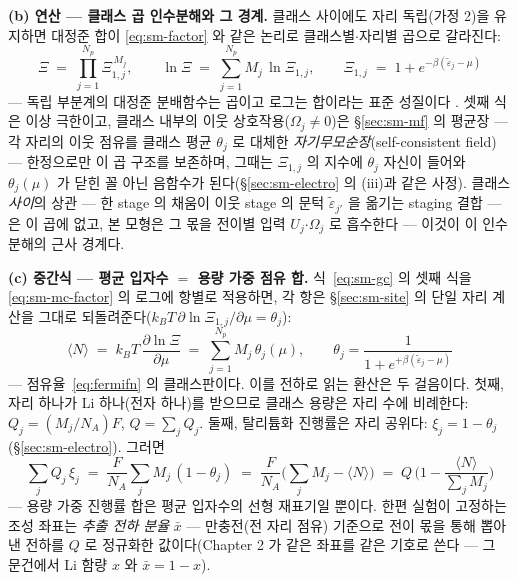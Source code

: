 \textbf{(b) 연산 --- 클래스 곱 인수분해와 그 경계.} 클래스 사이에도 자리 독립(가정 2)을 유지하면
대정준 합이 \eqref{eq:sm-factor} 와 같은 논리로 클래스별$\cdot$자리별 곱으로 갈라진다:
\begin{equation}
\Xi\;=\;\prod_{j=1}^{N_p}\Xi_{1,j}^{\,M_j},\qquad
\ln\Xi\;=\;\sum_{j=1}^{N_p}M_j\,\ln\Xi_{1,j},\qquad
\Xi_{1,j}\;=\;1+e^{-\beta(\tilde\varepsilon_j-\mu)}
\label{eq:sm-mc-factor}
\end{equation}
--- 독립 부분계의 대정준 분배함수는 곱이고 로그는 합이라는 표준 성질이다
\cite{hill1960,mcquarrie1976}. 셋째 식은 이상 극한이고, 클래스 내부의 이웃
상호작용($\Omega_j\ne0$)은 \S\ref{sec:sm-mf} 의 평균장 --- 각 자리의 이웃 점유를 클래스 평균
$\theta_j$ 로 대체한 \emph{자기무모순장}(self-consistent field) --- 한정으로만 이 곱 구조를
보존하며, 그때는 $\Xi_{1,j}$ 의 지수에 $\theta_j$ 자신이 들어와 $\theta_j(\mu)$ 가 닫힌 꼴 아닌
음함수가 된다(\S\ref{sec:sm-electro} 의 (iii)과 같은 사정). 클래스 \emph{사이}의 상관 --- 한 stage 의
채움이 이웃 stage 의 문턱 $\tilde\varepsilon_{j'}$ 을 옮기는 staging 결합 --- 은 이 곱에 없고, 본
모형은 그 몫을 전이별 입력 $U_j$$\cdot$$\Omega_j$ 로 흡수한다 --- 이것이 이 인수분해의 근사 경계다.

\textbf{(c) 중간식 --- 평균 입자수 $=$ 용량 가중 점유 합.} 식~\eqref{eq:sm-gc} 의 셋째 식을
\eqref{eq:sm-mc-factor} 의 로그에 항별로 적용하면, 각 항은 \S\ref{sec:sm-site} 의 단일 자리 계산을
그대로 되돌려준다($k_BT\,\partial\ln\Xi_{1,j}/\partial\mu=\theta_j$):
\begin{equation}
\langle N\rangle\;=\;k_BT\,\frac{\partial\ln\Xi}{\partial\mu}
\;=\;\sum_{j=1}^{N_p}M_j\,\theta_j(\mu),\qquad
\theta_j=\frac{1}{1+e^{+\beta(\tilde\varepsilon_j-\mu)}}
\label{eq:sm-mc-avgN}
\end{equation}
--- 점유율~\eqref{eq:fermifn} 의 클래스판이다. 이를 전하로 읽는 환산은 두 걸음이다. 첫째, 자리 하나가
Li 하나(전자 하나)를 받으므로 클래스 용량은 자리 수에 비례한다: $Q_j=(M_j/N_A)F$,
$Q=\sum_jQ_j$. 둘째, 탈리튬화 진행률은 자리 공위다: $\xi_j=1-\theta_j$(\S\ref{sec:sm-electro}).
그러면
\[
\sum_jQ_j\,\xi_j
\;=\;\frac{F}{N_A}\sum_jM_j\,(1-\theta_j)
\;=\;\frac{F}{N_A}\Big(\sum_jM_j-\langle N\rangle\Big)
\;=\;Q\,\Big(1-\frac{\langle N\rangle}{\sum_jM_j}\Big)
\]
--- 용량 가중 진행률 합은 평균 입자수의 선형 재표기일 뿐이다. 한편 실험이 고정하는 조성 좌표는
\emph{추출 전하 분율} $\bar x$ --- 만충전(전 자리 점유) 기준으로 전이 몫을 통해 뽑아낸 전하를 $Q$ 로
정규화한 값이다(Chapter 2 가 같은 좌표를 같은 기호로 쓴다 --- 그 문건에서 Li 함량 $x$ 와
$\bar x=1-x$).

